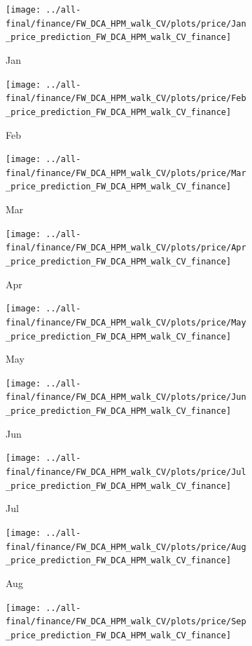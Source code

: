 \documentclass[ngerman]{ttlab-qualify}
\begin{document}
\newpage
\begin{figure}[H]
\centering
  \begin{subfigure}{.3\linewidth}
  \texttt{[image: ../all-final/finance/FW\_DCA\_HPM\_walk\_CV/plots/price/Jan\_price\_prediction\_FW\_DCA\_HPM\_walk\_CV\_finance]}\hfill
  \caption{Jan}
  \end{subfigure}
  \begin{subfigure}{.3\linewidth}
  \texttt{[image: ../all-final/finance/FW\_DCA\_HPM\_walk\_CV/plots/price/Feb\_price\_prediction\_FW\_DCA\_HPM\_walk\_CV\_finance]}\hfill
  \caption{Feb}
  \end{subfigure}
  \begin{subfigure}{.3\linewidth}
  \texttt{[image: ../all-final/finance/FW\_DCA\_HPM\_walk\_CV/plots/price/Mar\_price\_prediction\_FW\_DCA\_HPM\_walk\_CV\_finance]}\hfill
  \caption{Mar}
  \end{subfigure}\par\medskip
  \begin{subfigure}{.3\linewidth}
  \texttt{[image: ../all-final/finance/FW\_DCA\_HPM\_walk\_CV/plots/price/Apr\_price\_prediction\_FW\_DCA\_HPM\_walk\_CV\_finance]}\hfill
  \caption{Apr}
  \end{subfigure}
  \begin{subfigure}{.3\linewidth}
  \texttt{[image: ../all-final/finance/FW\_DCA\_HPM\_walk\_CV/plots/price/May\_price\_prediction\_FW\_DCA\_HPM\_walk\_CV\_finance]}\hfill
  \caption{May}
  \end{subfigure}
  \begin{subfigure}{.3\linewidth}
  \texttt{[image: ../all-final/finance/FW\_DCA\_HPM\_walk\_CV/plots/price/Jun\_price\_prediction\_FW\_DCA\_HPM\_walk\_CV\_finance]}\hfill
  \caption{Jun}
  \end{subfigure}\par\medskip
  \begin{subfigure}{.3\linewidth}
  \texttt{[image: ../all-final/finance/FW\_DCA\_HPM\_walk\_CV/plots/price/Jul\_price\_prediction\_FW\_DCA\_HPM\_walk\_CV\_finance]}\hfill
  \caption{Jul}
  \end{subfigure}
  \begin{subfigure}{.3\linewidth}
  \texttt{[image: ../all-final/finance/FW\_DCA\_HPM\_walk\_CV/plots/price/Aug\_price\_prediction\_FW\_DCA\_HPM\_walk\_CV\_finance]}\hfill
  \caption{Aug}
  \end{subfigure}
  \begin{subfigure}{.3\linewidth}
  \texttt{[image: ../all-final/finance/FW\_DCA\_HPM\_walk\_CV/plots/price/Sep\_price\_prediction\_FW\_DCA\_HPM\_walk\_CV\_finance]}\hfill

\end{subfigure}
\end{figure}
\end{document}
